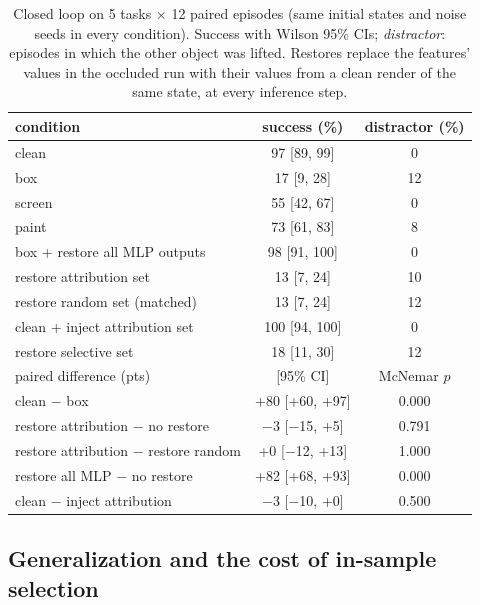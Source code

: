 \documentclass{article}
\begin{document}
\begin{table}[t]
\centering\small
\caption{Closed loop on 5 tasks $\times$ 12 paired episodes (same initial states and noise seeds in every condition). Success with Wilson 95\% CIs; \emph{distractor}: episodes in which the other object was lifted. Restores replace the features' values in the occluded run with their values from a clean render of the same state, at every inference step.}
\label{tab:closedloop}
\begin{tabular}{lcc}
\toprule
condition & success (\%) & distractor (\%) \\
\midrule
clean & 97 [89, 99] & 0 \\
box & 17 [9, 28] & 12 \\
screen & 55 [42, 67] & 0 \\
paint & 73 [61, 83] & 8 \\
box + restore all MLP outputs & 98 [91, 100] & 0 \\
restore attribution set & 13 [7, 24] & 10 \\
restore random set (matched) & 13 [7, 24] & 12 \\
clean + inject attribution set & 100 [94, 100] & 0 \\
restore selective set & 18 [11, 30] & 12 \\
\midrule
paired difference (pts) & [95\% CI] & McNemar $p$ \\
\midrule
clean $-$ box & +80 [+60, +97] & 0.000 \\
restore attribution $-$ no restore & $-$3 [$-$15, +5] & 0.791 \\
restore attribution $-$ restore random & +0 [$-$12, +13] & 1.000 \\
restore all MLP $-$ no restore & +82 [+68, +93] & 0.000 \\
clean $-$ inject attribution & $-$3 [$-$10, +0] & 0.500 \\
\bottomrule
\end{tabular}
\end{table}

\subsection{Generalization and the cost of in-sample selection}
\label{sec:generalization}
\end{document}
